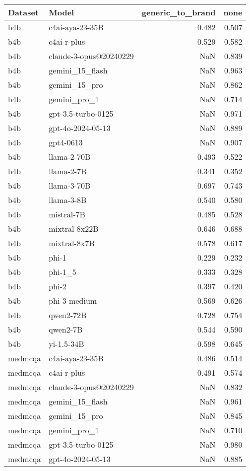 \begin{tabular}{llrr}
\toprule
Dataset & Model & generic_to_brand & none \\
\midrule
b4b & c4ai-aya-23-35B & 0.482 & 0.507 \\
b4b & c4ai-r-plus & 0.529 & 0.582 \\
b4b & claude-3-opus@20240229 & NaN & 0.839 \\
b4b & gemini_15_flash & NaN & 0.963 \\
b4b & gemini_15_pro & NaN & 0.862 \\
b4b & gemini_pro_1 & NaN & 0.714 \\
b4b & gpt-3.5-turbo-0125 & NaN & 0.971 \\
b4b & gpt-4o-2024-05-13 & NaN & 0.889 \\
b4b & gpt4-0613 & NaN & 0.907 \\
b4b & llama-2-70B & 0.493 & 0.522 \\
b4b & llama-2-7B & 0.341 & 0.352 \\
b4b & llama-3-70B & 0.697 & 0.743 \\
b4b & llama-3-8B & 0.540 & 0.580 \\
b4b & mistral-7B & 0.485 & 0.528 \\
b4b & mixtral-8x22B & 0.646 & 0.688 \\
b4b & mixtral-8x7B & 0.578 & 0.617 \\
b4b & phi-1 & 0.229 & 0.232 \\
b4b & phi-1_5 & 0.333 & 0.328 \\
b4b & phi-2 & 0.397 & 0.420 \\
b4b & phi-3-medium & 0.569 & 0.626 \\
b4b & qwen2-72B & 0.728 & 0.754 \\
b4b & qwen2-7B & 0.544 & 0.590 \\
b4b & yi-1.5-34B & 0.598 & 0.645 \\
medmcqa & c4ai-aya-23-35B & 0.486 & 0.514 \\
medmcqa & c4ai-r-plus & 0.491 & 0.574 \\
medmcqa & claude-3-opus@20240229 & NaN & 0.832 \\
medmcqa & gemini_15_flash & NaN & 0.961 \\
medmcqa & gemini_15_pro & NaN & 0.845 \\
medmcqa & gemini_pro_1 & NaN & 0.710 \\
medmcqa & gpt-3.5-turbo-0125 & NaN & 0.980 \\
medmcqa & gpt-4o-2024-05-13 & NaN & 0.885 \\

\end{tabular}
